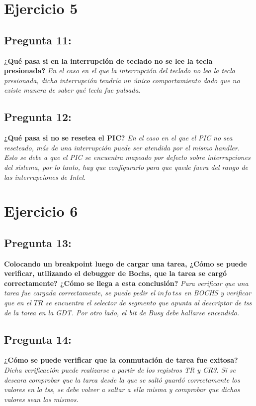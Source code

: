 \documentclass[10pt, a4paper]{article}
\begin{document}
\section{Ejercicio 5}
{\subsection{Pregunta 11:}} \textbf{¿Qué pasa si en la interrupción de teclado no se lee la tecla presionada?}\newline
\newline
\textit{En el caso en el que la interrupción del teclado no lea la tecla presionada, dicha interrupción tendría un único comportamiento dado que no existe manera de saber qué tecla fue pulsada.}

{\subsection{Pregunta 12:}} \textbf{¿Qué pasa si no se resetea el PIC?}\newline
\newline
\textit{En el caso en el que el PIC no sea reseteado, más de una interrupción puede ser atendida por el mismo handler. Esto se debe a que el PIC se encuentra mapeado por defecto sobre interrupciones del sistema, por lo tanto, hay que configurarlo para que quede fuera del rango de las interrupciones de Intel.}

\section{Ejercicio 6}

{\subsection{Pregunta 13:}} \textbf{Colocando un breakpoint luego de cargar una tarea, ¿Cómo se puede verificar, utilizando el debugger de Bochs, que la tarea se cargó correctamente?
¿Cómo se llega a esta conclusión?}\newline
\newline
\textit{Para verificar que una tarea fue cargada correctamente, se puede pedir el $info\ tss$ en BOCHS y verificar que en el $TR$ se encuentra el selector de segmento que apunta al descriptor de tss de la tarea en la GDT. Por otro lado, el bit de Busy debe hallarse encendido.}

{\subsection{Pregunta 14:}} \textbf{¿Cómo se puede verificar que la conmutación de tarea fue exitosa?}\newline
\newline
\textit{Dicha verificación puede realizarse a partir de los registros TR y CR3. Si se deseara comprobar que la tarea desde la que se saltó guardó correctamente los valores en la tss, se debe volver a saltar a ella misma y comprobar que dichos valores sean los mismos.}
\end{document}
